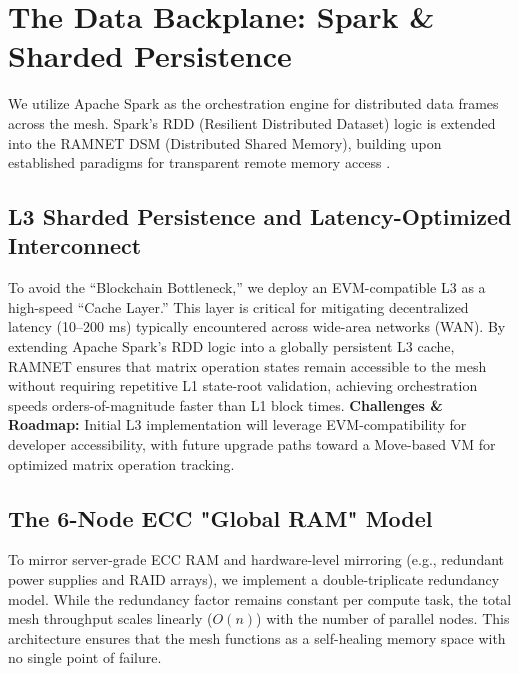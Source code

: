 \documentclass[conference]{IEEEtran}
\begin{document}
\section{The Data Backplane: Spark \& Sharded Persistence}
We utilize Apache Spark as the orchestration engine for distributed data frames across the mesh. Spark's RDD (Resilient Distributed Dataset) logic is extended into the RAMNET DSM (Distributed Shared Memory), building upon established paradigms for transparent remote memory access \cite{wiki2024dsm}.

\subsection{L3 Sharded Persistence and Latency-Optimized Interconnect}
To avoid the ``Blockchain Bottleneck,'' we deploy an EVM-compatible L3 as a high-speed ``Cache Layer.'' This layer is critical for mitigating decentralized latency (10--200 ms) typically encountered across wide-area networks (WAN). By extending Apache Spark's RDD logic into a globally persistent L3 cache, RAMNET ensures that matrix operation states remain accessible to the mesh without requiring repetitive L1 state-root validation, achieving orchestration speeds orders-of-magnitude faster than L1 block times. \textbf{Challenges \& Roadmap:} Initial L3 implementation will leverage EVM-compatibility for developer accessibility, with future upgrade paths toward a Move-based VM for optimized matrix operation tracking.

\subsection{The 6-Node ECC "Global RAM" Model}
To mirror server-grade ECC RAM and hardware-level mirroring (e.g., redundant power supplies and RAID arrays), we implement a double-triplicate redundancy model. While the redundancy factor remains constant per compute task, the total mesh throughput scales linearly ($O(n)$) with the number of parallel nodes. This architecture ensures that the mesh functions as a self-healing memory space with no single point of failure.
\end{document}
